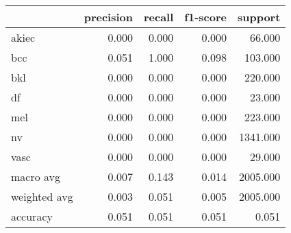 \begin{tabular}{lrrrr}
\toprule
 & precision & recall & f1-score & support \\
\midrule
akiec & 0.000 & 0.000 & 0.000 & 66.000 \\
bcc & 0.051 & 1.000 & 0.098 & 103.000 \\
bkl & 0.000 & 0.000 & 0.000 & 220.000 \\
df & 0.000 & 0.000 & 0.000 & 23.000 \\
mel & 0.000 & 0.000 & 0.000 & 223.000 \\
nv & 0.000 & 0.000 & 0.000 & 1341.000 \\
vasc & 0.000 & 0.000 & 0.000 & 29.000 \\
macro avg & 0.007 & 0.143 & 0.014 & 2005.000 \\
weighted avg & 0.003 & 0.051 & 0.005 & 2005.000 \\
accuracy & 0.051 & 0.051 & 0.051 & 0.051 \\
\bottomrule
\end{tabular}
